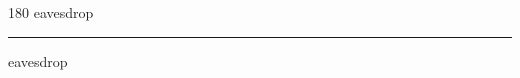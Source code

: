 
\begin{frame}
\begin{center}
\begin{turn}{180}
{\fontsize{2.5cm}{1em}\selectfont eavesdrop}
\end{turn}
\vspace{1em}\par  
\hrule
\vspace{1em}\par  
{\fontsize{2.5cm}{1em}\selectfont eavesdrop}
\end{center}
\end{frame}
